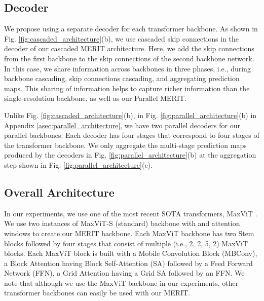 \documentclass{midl}
\begin{document}
\subsection{Decoder}
We propose using a separate decoder for each transformer backbone. As shown in Fig.  \ref{fig:cascaded_architecture}(b), we use cascaded skip connections in the decoder of our cascaded MERIT architecture. Here, we add the skip connections from the first backbone to the skip connections of the second backbone network. In this case, we share information across backbones in three phases, i.e., during backbone cascading, skip connections cascading, and aggregating prediction maps. This sharing of information helps to capture richer information than the single-resolution backbone, as well as our Parallel MERIT.

Unlike Fig. \ref{fig:cascaded_architecture}(b), in Fig. \ref{fig:parallel_architecture}(b) in Appendix \ref{asec:parallel_architecture}, we have two parallel decoders for our parallel backbones. Each decoder has four stages that correspond to four stages of the transformer backbone. We only aggregate the multi-stage prediction maps produced by the decoders in Fig. \ref{fig:parallel_architecture}(b) at the aggregation step shown in Fig. \ref{fig:parallel_architecture}(c). 


\subsection{Overall Architecture}
In our experiments, we use one of the most recent SOTA transformers, MaxViT \cite{tu2022maxvit}. We use two instances of MaxViT-S (standard) backbone with  and  attention windows to create our MERIT backbone. Each MaxViT backbone has two Stem blocks followed by four stages that consist of multiple (i.e., 2, 2, 5, 2) MaxViT blocks. Each MaxViT block is built with a Mobile Convolution Block (MBConv), a Block Attention having Block Self-Attention (SA) followed by a Feed Forward Network (FFN), a Grid Attention having a Grid SA followed by an FFN. We note that although we use the MaxViT backbone in our experiments, other transformer backbones can easily be used with our MERIT. 
\end{document}
